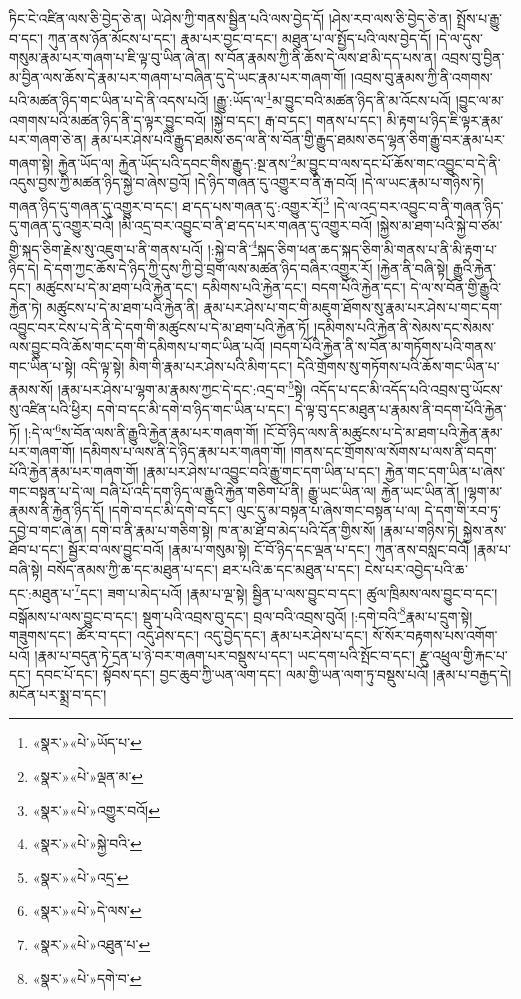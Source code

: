 ཏིང་ངེ་འཛིན་ལས་ཅི་བྱེད་ཅེ་ན། ཡེ་ཤེས་ཀྱི་གནས་སྦྱིན་པའི་ལས་བྱེད་དོ། །ཤེས་རབ་ལས་ཅི་བྱེད་ཅེ་ན། སྤྲོས་པ་རྒྱུ་བ་དང་། ཀུན་ནས་ཉོན་མོངས་པ་དང་། རྣམ་པར་བྱང་བ་དང་། མཐུན་པ་ལ་སྤྱོད་པའི་ལས་བྱེད་དོ། །དེ་ལ་དུས་གསུམ་རྣམ་པར་གཞག་པ་ཇི་ལྟ་བུ་ཡིན་ཞེ་ན། ས་བོན་རྣམས་ཀྱི་ནི་ཆོས་དེ་ལས་ཐ་མི་དད་པས་ན། འབྲས་བུ་བྱིན་མ་བྱིན་ལས་ཆོས་དེ་རྣམ་པར་གཞག་པ་བཞིན་དུ་དེ་ཡང་རྣམ་པར་གཞག་གོ། །འབྲས་བུ་རྣམས་ཀྱི་ནི་འགགས་པའི་མཚན་ཉིད་གང་ཡིན་པ་དེ་ནི་འདས་པའོ། །རྒྱུ་:ཡོད་ལ་\footnote{«སྣར་»«པེ་»ཡོད་པ་}མ་བྱུང་བའི་མཚན་ཉིད་ནི་མ་འོངས་པའོ། །བྱུང་ལ་མ་འགགས་པའི་མཚན་ཉིད་ནི་ད་ལྟར་བྱུང་བའོ། །སྐྱེ་བ་དང་། རྒ་བ་དང་། གནས་པ་དང་། མི་རྟག་པ་ཉིད་ཇི་ལྟར་རྣམ་པར་གཞག་ཅེ་ན། རྣམ་པར་ཤེས་པའི་རྒྱུད་ཐམས་ཅད་ལ་ནི་ས་བོན་གྱི་རྒྱུད་ཐམས་ཅད་ལྷན་ཅིག་རྒྱུ་བར་རྣམ་པར་གཞག་སྟེ། རྐྱེན་ཡོད་ལ། རྐྱེན་ཡོད་པའི་དབང་གིས་རྒྱུད་:སྔ་ནས་\footnote{«སྣར་»«པེ་»ལྡན་མ་}མ་བྱུང་བ་ལས་དང་པོ་ཆོས་གང་འབྱུང་བ་དེ་ནི་འདུས་བྱས་ཀྱི་མཚན་ཉིད་སྐྱེ་བ་ཞེས་བྱའོ། །དེ་ཉིད་གཞན་དུ་འགྱུར་བ་ནི་རྒ་བའོ། །དེ་ལ་ཡང་རྣམ་པ་གཉིས་ཏེ། གཞན་ཉིད་དུ་གཞན་དུ་འགྱུར་བ་དང་། ཐ་དད་པས་གཞན་དུ་:འགྱུར་རོ།\footnote{«སྣར་»«པེ་»འགྱུར་བའོ།} །དེ་ལ་འདྲ་བར་འབྱུང་བ་ནི་གཞན་ཉིད་དུ་གཞན་དུ་འགྱུར་བའོ། །མི་འདྲ་བར་འབྱུང་བ་ནི་ཐ་དད་པར་གཞན་དུ་འགྱུར་བའོ། །སྐྱེས་མ་ཐག་པའི་སྐྱེ་བ་ཙམ་གྱི་སྐད་ཅིག་རྗེས་སུ་འཇུག་པ་ནི་གནས་པའོ། །:སྐྱེ་བ་ནི་\footnote{«སྣར་»«པེ་»སྐྱེ་བའི་}སྐད་ཅིག་ཕན་ཆད་སྐད་ཅིག་མི་གནས་པ་ནི་མི་རྟག་པ་ཉིད་དེ། དེ་དག་ཀྱང་ཆོས་དེ་ཉིད་ཀྱི་དུས་ཀྱི་བྱེ་བྲག་ལས་མཚན་ཉིད་བཞིར་འགྱུར་རོ། །རྐྱེན་ནི་བཞི་སྟེ། རྒྱུའི་རྐྱེན་དང་། མཚུངས་པ་དེ་མ་ཐག་པའི་རྐྱེན་དང་། དམིགས་པའི་རྐྱེན་དང་། བདག་པོའི་རྐྱེན་དང་། དེ་ལ་ས་བོན་གྱི་རྒྱུའི་རྐྱེན་ཏེ། མཚུངས་པ་དེ་མ་ཐག་པའི་རྐྱེན་ནི། རྣམ་པར་ཤེས་པ་གང་གི་མཇུག་ཐོགས་སུ་རྣམ་པར་ཤེས་པ་གང་དག་འབྱུང་བར་ངེས་པ་དེ་ནི་དེ་དག་གི་མཚུངས་པ་དེ་མ་ཐག་པའི་རྐྱེན་ཏོ། །དམིགས་པའི་རྐྱེན་ནི་སེམས་དང་སེམས་ལས་བྱུང་བའི་ཆོས་གང་དག་གི་དམིགས་པ་གང་ཡིན་པའོ། །བདག་པོའི་རྐྱེན་ནི་ས་བོན་མ་གཏོགས་པའི་གནས་གང་ཡིན་པ་སྟེ། འདི་ལྟ་སྟེ། མིག་གི་རྣམ་པར་ཤེས་པའི་མིག་དང་། དེའི་གྲོགས་སུ་གཏོགས་པའི་ཆོས་གང་ཡིན་པ་རྣམས་སོ། །རྣམ་པར་ཤེས་པ་ལྷག་མ་རྣམས་ཀྱང་དེ་དང་:འདྲ་བ་\footnote{«སྣར་»«པེ་»འདྲ་}སྟེ། འདོད་པ་དང་མི་འདོད་པའི་འབྲས་བུ་ཡོངས་སུ་འཛིན་པའི་ཕྱིར། དགེ་བ་དང་མི་དགེ་བ་ཉིད་གང་ཡིན་པ་དང་། དེ་ལྟ་བུ་དང་མཐུན་པ་རྣམས་ནི་བདག་པོའི་རྐྱེན་ཏོ། །:དེ་ལ་\footnote{«སྣར་»«པེ་»དེ་ལས་}ས་བོན་ལས་ནི་རྒྱུའི་རྐྱེན་རྣམ་པར་གཞག་གོ། །ངོ་བོ་ཉིད་ལས་ནི་མཚུངས་པ་དེ་མ་ཐག་པའི་རྐྱེན་རྣམ་པར་གཞག་གོ། །དམིགས་པ་ལས་ནི་དེ་ཉིད་རྣམ་པར་གཞག་གོ། །གནས་དང་གྲོགས་ལ་སོགས་པ་ལས་ནི་བདག་པོའི་རྐྱེན་རྣམ་པར་གཞག་གོ། །རྣམ་པར་ཤེས་པ་འབྱུང་བའི་རྒྱུ་གང་དག་ཡིན་པ་དང་། རྐྱེན་གང་དག་ཡིན་པ་ཞེས་གང་བསྟན་པ་དེ་ལ། བཞི་པོ་འདི་དག་ཉིད་ལ་རྒྱུའི་རྐྱེན་གཅིག་པོ་ནི། རྒྱུ་ཡང་ཡིན་ལ། རྐྱེན་ཡང་ཡིན་ནོ། །ལྷག་མ་རྣམས་ནི་རྐྱེན་ཉིད་དོ། །དགེ་བ་དང་མི་དགེ་བ་དང་། ལུང་དུ་མ་བསྟན་པ་ཞེས་གང་བསྟན་པ་ལ། དེ་དག་གི་རབ་ཏུ་དབྱེ་བ་གང་ཞེ་ན། དགེ་བ་ནི་རྣམ་པ་གཅིག་སྟེ། ཁ་ན་མ་ཐོ་བ་མེད་པའི་དོན་གྱིས་སོ། །རྣམ་པ་གཉིས་ཏེ། སྐྱེས་ནས་ཐོབ་པ་དང་། སྦྱོར་བ་ལས་བྱུང་བའོ། །རྣམ་པ་གསུམ་སྟེ། ངོ་བོ་ཉིད་དང་ལྡན་པ་དང་། ཀུན་ནས་བསླང་བའོ། །རྣམ་པ་བཞི་སྟེ། བསོད་ནམས་ཀྱི་ཆ་དང་མཐུན་པ་དང་། ཐར་པའི་ཆ་དང་མཐུན་པ་དང་། ངེས་པར་འབྱེད་པའི་ཆ་དང་:མཐུན་པ་\footnote{«སྣར་»«པེ་»འཐུན་པ་}དང་། ཟག་པ་མེད་པའོ། །རྣམ་པ་ལྔ་སྟེ། སྦྱིན་པ་ལས་བྱུང་བ་དང་། ཚུལ་ཁྲིམས་ལས་བྱུང་བ་དང་། བསྒོམས་པ་ལས་བྱུང་བ་དང་། སྡུག་པའི་འབྲས་བུ་དང་། བྲལ་བའི་འབྲས་བུའོ། །:དགེ་བའི་\footnote{«སྣར་»«པེ་»དགེ་བ་}རྣམ་པ་དྲུག་སྟེ། གཟུགས་དང་། ཚོར་བ་དང་། འདུ་ཤེས་དང་། འདུ་བྱེད་དང་། རྣམ་པར་ཤེས་པ་དང་། སོ་སོར་བརྟགས་པས་འགོག་པའོ། །རྣམ་པ་བདུན་ཏེ་དྲན་པ་ཉེ་བར་གཞག་པར་བསྡུས་པ་དང་། ཡང་དག་པའི་སྤོང་བ་དང་། རྫུ་འཕྲུལ་གྱི་རྐང་པ་དང་། དབང་པོ་དང་། སྟོབས་དང་། བྱང་ཆུབ་ཀྱི་ཡན་ལག་དང་། ལམ་གྱི་ཡན་ལག་ཏུ་བསྡུས་པའོ། །རྣམ་པ་བརྒྱད་དེ། མངོན་པར་སྨྲ་བ་དང་། 